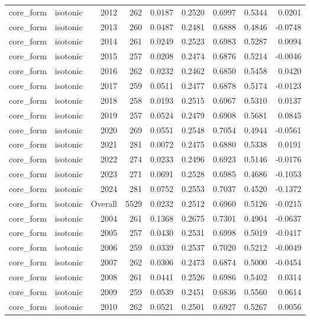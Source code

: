 \begin{table}[t]
\begin{tabular}{@{} l l r r r r r r r @{} }
      core\_form & isotonic & 2012 & 262 & 0.0187 & 0.2520 & 0.6997 & 0.5344 & 0.0201 \\
      core\_form & isotonic & 2013 & 260 & 0.0487 & 0.2481 & 0.6888 & 0.4846 & -0.0748 \\
      core\_form & isotonic & 2014 & 261 & 0.0249 & 0.2523 & 0.6983 & 0.5287 & 0.0094 \\
      core\_form & isotonic & 2015 & 257 & 0.0208 & 0.2474 & 0.6876 & 0.5214 & -0.0046 \\
      core\_form & isotonic & 2016 & 262 & 0.0232 & 0.2462 & 0.6850 & 0.5458 & 0.0420 \\
      core\_form & isotonic & 2017 & 259 & 0.0511 & 0.2477 & 0.6878 & 0.5174 & -0.0123 \\
      core\_form & isotonic & 2018 & 258 & 0.0193 & 0.2515 & 0.6967 & 0.5310 & 0.0137 \\
      core\_form & isotonic & 2019 & 257 & 0.0524 & 0.2479 & 0.6908 & 0.5681 & 0.0845 \\
      core\_form & isotonic & 2020 & 269 & 0.0551 & 0.2548 & 0.7054 & 0.4944 & -0.0561 \\
      core\_form & isotonic & 2021 & 281 & 0.0072 & 0.2475 & 0.6880 & 0.5338 & 0.0191 \\
      core\_form & isotonic & 2022 & 274 & 0.0233 & 0.2496 & 0.6923 & 0.5146 & -0.0176 \\
      core\_form & isotonic & 2023 & 271 & 0.0691 & 0.2528 & 0.6985 & 0.4686 & -0.1053 \\
      core\_form & isotonic & 2024 & 281 & 0.0752 & 0.2553 & 0.7037 & 0.4520 & -0.1372 \\
      core\_form & isotonic & Overall & 5529 & 0.0232 & 0.2512 & 0.6960 & 0.5126 & -0.0215 \\
      core\_form & isotonic & 2004 & 261 & 0.1368 & 0.2675 & 0.7301 & 0.4904 & -0.0637 \\
      core\_form & isotonic & 2005 & 257 & 0.0430 & 0.2531 & 0.6998 & 0.5019 & -0.0417 \\
      core\_form & isotonic & 2006 & 259 & 0.0339 & 0.2537 & 0.7020 & 0.5212 & -0.0049 \\
      core\_form & isotonic & 2007 & 262 & 0.0306 & 0.2473 & 0.6874 & 0.5000 & -0.0454 \\
      core\_form & isotonic & 2008 & 261 & 0.0441 & 0.2526 & 0.6986 & 0.5402 & 0.0314 \\
      core\_form & isotonic & 2009 & 259 & 0.0539 & 0.2451 & 0.6836 & 0.5560 & 0.0614 \\
      core\_form & isotonic & 2010 & 262 & 0.0521 & 0.2501 & 0.6927 & 0.5267 & 0.0056 \\

\end{tabular}
\end{table}
